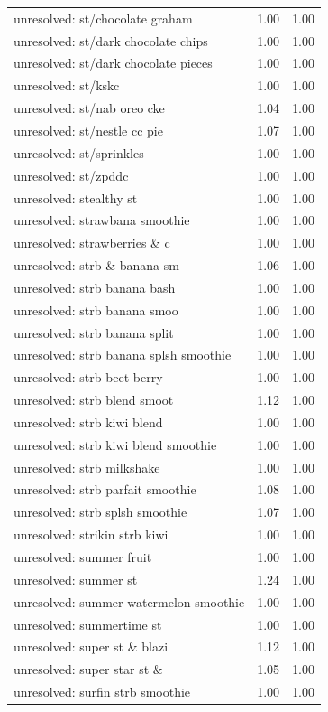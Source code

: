 \begin{table}
\begin{tabular}{lrr}
unresolved: st/chocolate graham & 1.00 & 1.00 \\
unresolved: st/dark chocolate chips & 1.00 & 1.00 \\
unresolved: st/dark chocolate pieces & 1.00 & 1.00 \\
unresolved: st/kskc & 1.00 & 1.00 \\
unresolved: st/nab oreo cke & 1.04 & 1.00 \\
unresolved: st/nestle cc pie & 1.07 & 1.00 \\
unresolved: st/sprinkles & 1.00 & 1.00 \\
unresolved: st/zpddc & 1.00 & 1.00 \\
unresolved: stealthy st & 1.00 & 1.00 \\
unresolved: strawbana smoothie & 1.00 & 1.00 \\
unresolved: strawberries \& c & 1.00 & 1.00 \\
unresolved: strb \& banana sm & 1.06 & 1.00 \\
unresolved: strb banana bash & 1.00 & 1.00 \\
unresolved: strb banana smoo & 1.00 & 1.00 \\
unresolved: strb banana split & 1.00 & 1.00 \\
unresolved: strb banana splsh smoothie & 1.00 & 1.00 \\
unresolved: strb beet berry & 1.00 & 1.00 \\
unresolved: strb blend smoot & 1.12 & 1.00 \\
unresolved: strb kiwi blend & 1.00 & 1.00 \\
unresolved: strb kiwi blend smoothie & 1.00 & 1.00 \\
unresolved: strb milkshake & 1.00 & 1.00 \\
unresolved: strb parfait smoothie & 1.08 & 1.00 \\
unresolved: strb splsh smoothie & 1.07 & 1.00 \\
unresolved: strikin strb kiwi & 1.00 & 1.00 \\
unresolved: summer fruit & 1.00 & 1.00 \\
unresolved: summer st & 1.24 & 1.00 \\
unresolved: summer watermelon smoothie & 1.00 & 1.00 \\
unresolved: summertime st & 1.00 & 1.00 \\
unresolved: super st \& blazi & 1.12 & 1.00 \\
unresolved: super star st \& & 1.05 & 1.00 \\
unresolved: surfin strb smoothie & 1.00 & 1.00 \\

\end{tabular}
\end{table}
